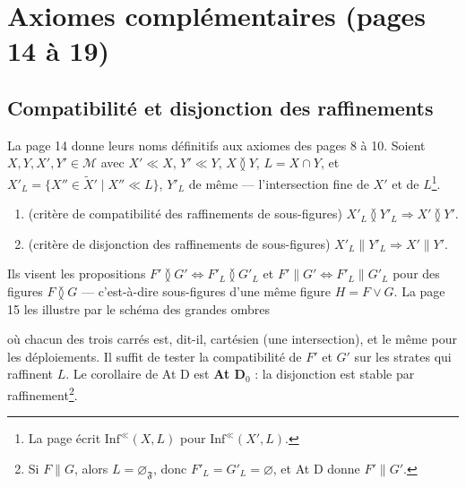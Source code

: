 \documentclass[11pt,a4paper]{article}
\begin{document}
\section*{Axiomes complémentaires (pages 14 à 19)}

\subsection*{Compatibilité et disjonction des raffinements}

La page 14 donne leurs noms définitifs aux axiomes des pages 8 à 10. Soient $X,
Y, X', Y' \in \mathcal{M}$ avec $X' \ll X$, $Y' \ll Y$, $X \between Y$, $L = X
\cap Y$, et $X'_{L} = \{X'' \in \widetilde{X}' \mid X'' \ll L\}$, $Y'_{L}$ de
même --- l'intersection fine de $X'$ et de $L$\footnote{La page écrit
$\mathrm{Inf}^{\ll}(X, L)$ pour $\mathrm{Inf}^{\ll}(X', L)$.}.

\begin{enumerate}
\item[\textbf{At C}] (critère de compatibilité des raffinements de sous-figures)
$X'_{L} \between Y'_{L} \Rightarrow X' \between Y'$.
\item[\textbf{At D}] (critère de disjonction des raffinements de sous-figures)
$X'_{L} \parallel Y'_{L} \Rightarrow X' \parallel Y'$.
\end{enumerate}

Ils visent les propositions $F' \between G' \iff F'_{L} \between G'_{L}$ et $F'
\parallel G' \iff F'_{L} \parallel G'_{L}$ pour des figures $F \between G$ ---
c'est-à-dire sous-figures d'une même figure $H = F \vee G$. La page 15 les
illustre par le schéma des grandes ombres


où chacun des trois carrés est, dit-il, cartésien (une intersection), et le même
pour les déploiements. Il suffit de tester la compatibilité de $F'$ et $G'$ sur
les strates qui raffinent $L$. Le corollaire de At D est \textbf{At
D}$_{0}$ : la disjonction est stable par raffinement\footnote{Si $F \parallel G$,
alors $L = \varnothing_{\mathfrak{F}}$, donc $F'_{L} = G'_{L} = \varnothing$, et At D
donne $F' \parallel G'$.}.
\end{document}
